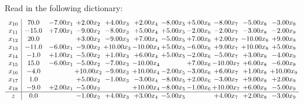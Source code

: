 \documentclass[9pt]{article}
\begin{document}
Read in the following dictionary:
\[\begin{array}{c| c c@{\hskip 2pt} c@{\hskip 2pt} c@{\hskip 2pt} c@{\hskip 2pt} c@{\hskip 2pt} c@{\hskip 2pt} c@{\hskip 2pt} c@{\hskip 2pt} c@{\hskip 2pt} }
 x_{10}   &  70.0 & -7.00 x_{1} & +  2.00 x_{2} & +  4.00 x_{3} & +  2.00 x_{4} & -8.00 x_{5} & +  5.00 x_{6} & -8.00 x_{7} & -5.00 x_{8} & -3.00 x_{9}\\
 x_{11}   &  -15.0 & +  7.00 x_{1} & -9.00 x_{2} & -8.00 x_{3} & +  5.00 x_{4} & +  5.00 x_{5} & -2.00 x_{6} & -2.00 x_{7} & -3.00 x_{8} & -2.00 x_{9}\\
 x_{12}   &  20.0  &   & +  3.00 x_{2} & -9.00 x_{3} & +  7.00 x_{4} & -5.00 x_{5} & +  7.00 x_{6} & +  2.00 x_{7} & -10.00 x_{8} & +  9.00 x_{9}\\
 x_{13}   &  -11.0 & -6.00 x_{1} & -9.00 x_{2} & + 10.00 x_{3} & -10.00 x_{4} & +  5.00 x_{5} & -6.00 x_{6} & +  9.00 x_{7} & + 10.00 x_{8} & +  5.00 x_{9}\\
 x_{14}   &  -1.0 & +  1.00 x_{1} & -5.00 x_{2} & +  1.00 x_{3} & +  6.00 x_{4} & +  5.00 x_{5} & -2.00 x_{6} & -5.00 x_{7} & +  3.00 x_{8} & -4.00 x_{9}\\
 x_{15}   &  15.0 & -6.00 x_{1} & -5.00 x_{2} & -7.00 x_{3} & -10.00 x_{4} &   & +  7.00 x_{6} & -10.00 x_{7} & +  6.00 x_{8} & -6.00 x_{9}\\
 x_{16}   &  -4.0  &   & + 10.00 x_{2} & -9.00 x_{3} & + 10.00 x_{4} & -2.00 x_{5} & -3.00 x_{6} & +  6.00 x_{7} & +  1.00 x_{8} & + 10.00 x_{9}\\
 x_{17}   &  1.0  &   & +  5.00 x_{2} & -1.00 x_{3} & -3.00 x_{4} & -8.00 x_{5} & +  2.00 x_{6} & -3.00 x_{7} & +  9.00 x_{8} & +  2.00 x_{9}\\
 x_{18}   &  -9.0 & +  2.00 x_{1} & -5.00 x_{2} &   & + 10.00 x_{4} & -8.00 x_{5} & -1.00 x_{6} & + 10.00 x_{7} & +  6.00 x_{8} & -5.00 x_{9}\\
\hline
z    &  0.0  &   & -1.00 x_{2} & +  4.00 x_{3} & +  3.00 x_{4} & -5.00 x_{5} &   & +  4.00 x_{7} & +  2.00 x_{8} & -3.00 x_{9}\\
\end{array}\]
\end{document}
